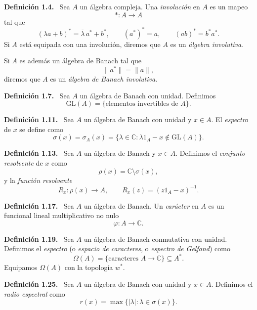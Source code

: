 \documentclass[11pt]{article}
\newcommand{\GL}{\mathrm{GL}}
\newenvironment{definicion}[1]
  {\par\medskip\noindent\textbf{Definición #1.}\ }
  {\par\medskip}
\begin{document}
\begin{definicion}{1.4}
Sea $A$ un álgebra compleja. Una \emph{involución} en $A$ es un mapeo
\[
  *:A\longrightarrow A
\]
tal que
\[
  (\lambda a+b)^*=\overline{\lambda}\,a^*+b^*,
  \qquad
  (a^*)^*=a,
  \qquad
  (ab)^*=b^*a^*.
\]
Si $A$ está equipada con una involución, diremos que $A$ es un \emph{álgebra involutiva}.

Si $A$ es además un álgebra de Banach tal que
\[
  \lVert a^*\rVert=\lVert a\rVert,
\]
diremos que $A$ es un \emph{álgebra de Banach involutiva}.
\end{definicion}

\begin{definicion}{1.7}
Sea $A$ un álgebra de Banach con unidad. Definimos
\[
  \GL(A)=\{\text{elementos invertibles de }A\}.
\]
\end{definicion}

\begin{definicion}{1.11}
Sea $A$ un álgebra de Banach con unidad y $x\in A$. El \emph{espectro} de $x$ se define como
\[
  \sigma(x)=\sigma_A(x)
  =\{\lambda\in\mathbb{C}:\lambda 1_A-x\notin\GL(A)\}.
\]
\end{definicion}

\begin{definicion}{1.13}
Sea $A$ un álgebra de Banach y $x\in A$. Definimos el \emph{conjunto resolvente} de $x$ como
\[
  \rho(x)=\mathbb{C}\setminus\sigma(x),
\]
y la \emph{función resolvente}
\[
  R_x:\rho(x)\longrightarrow A,
  \qquad
  R_x(z)=(z1_A-x)^{-1}.
\]
\end{definicion}

\begin{definicion}{1.17}
Sea $A$ un álgebra de Banach. Un \emph{carácter} en $A$ es un funcional lineal multiplicativo no nulo
\[
  \varphi:A\longrightarrow\mathbb{C}.
\]
\end{definicion}

\begin{definicion}{1.19}
Sea $A$ un álgebra de Banach conmutativa con unidad. Definimos el \emph{espectro} (o \emph{espacio de caracteres}, o \emph{espectro de Gelfand}) como
\[
  \Omega(A)=\{\text{caracteres }A\to\mathbb{C}\}\subseteq A^*.
\]
Equipamos $\Omega(A)$ con la topología $w^*$.
\end{definicion}

\begin{definicion}{1.25}
Sea $A$ un álgebra de Banach con unidad y $x\in A$. Definimos el \emph{radio espectral} como
\[
  r(x)=\max\{\lvert\lambda\rvert:\lambda\in\sigma(x)\}.
\]
\end{definicion}
\end{document}
